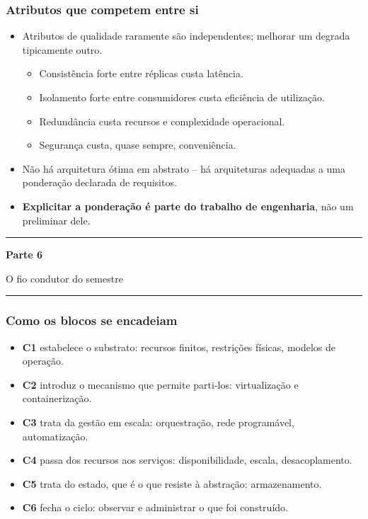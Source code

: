 \documentclass[aspectratio=169]{beamer}
\newcommand{\seccao}[2]{%
  \begin{frame}[plain]
    \vspace*{2.2cm}
    \begin{center}
      {\color{NudeTaupe}\rule{3cm}{0.5pt}}\par
      \vspace{0.6cm}
      {\Huge\bfseries\textcolor{TextEspresso}{#1}}\par
      \vspace{0.5cm}
      {\large\textcolor{NudeTaupe}{#2}}\par
      \vspace{0.6cm}
      {\color{NudeTaupe}\rule{3cm}{0.5pt}}
    \end{center}
  \end{frame}
}
\begin{document}
\begin{frame}
\frametitle{Atributos que competem entre si}
\begin{itemize}
    \setlength\itemsep{0.3cm}
    \item Atributos de qualidade raramente são independentes; melhorar um degrada tipicamente outro.
    \begin{itemize}
      \item Consistência forte entre réplicas custa latência.
      \item Isolamento forte entre consumidores custa eficiência de utilização.
      \item Redundância custa recursos e complexidade operacional.
      \item Segurança custa, quase sempre, conveniência.
    \end{itemize}
    \item Não há arquitetura ótima em abstrato -- há arquiteturas adequadas a uma ponderação declarada de requisitos.
    \item \textbf{Explicitar a ponderação é parte do trabalho de engenharia}, não um preliminar dele.
\end{itemize}
\end{frame}

\seccao{Parte 6}{O fio condutor do semestre}

\begin{frame}
\frametitle{Como os blocos se encadeiam}
\begin{itemize}
    \setlength\itemsep{0.3cm}
    \item \textbf{C1} estabelece o substrato: recursos finitos, restrições físicas, modelos de operação.
    \item \textbf{C2} introduz o mecanismo que permite parti-los: virtualização e containerização.
    \item \textbf{C3} trata da gestão em escala: orquestração, rede programável, automatização.
    \item \textbf{C4} passa dos recursos aos serviços: disponibilidade, escala, desacoplamento.
    \item \textbf{C5} trata do estado, que é o que resiste à abstração: armazenamento.
    \item \textbf{C6} fecha o ciclo: observar e administrar o que foi construído.
\end{itemize}
\end{frame}
\end{document}
